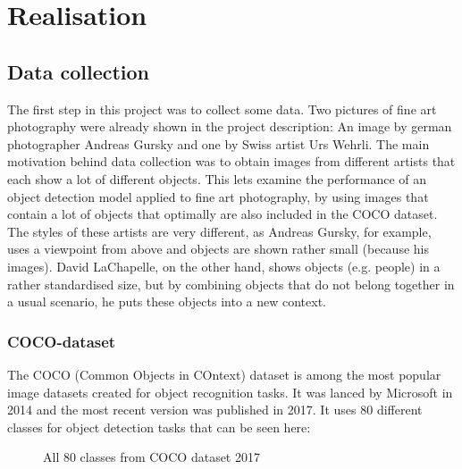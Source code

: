\chapter{Realisation}

\section{Data collection}

The first step in this project was to collect some data. Two pictures of fine art photography were already shown in the project description: An image by german photographer Andreas Gursky and one by Swiss artist Urs Wehrli. The main motivation behind data collection was to obtain images from different artists that each show a lot of different objects. This lets examine the performance of an object detection model applied to fine art photography, by using images that contain a lot of objects that optimally are also included in the COCO dataset. The styles of these artists are very different, as Andreas Gursky, for example, uses a viewpoint from above and objects are shown rather small (because his images). David LaChapelle, on the other hand, shows objects (e.g. people) in a rather standardised size, but by combining objects that do not belong together in a usual scenario, he puts these objects into a new context.

\subsection{COCO-dataset}

The COCO (Common Objects in COntext) dataset is among the most popular image datasets created for object recognition tasks. It was lanced by Microsoft in 2014 and the most recent version was published in 2017. It uses 80 different classes for object detection tasks that can be seen here:

\begin{figure}[!h]
	\caption{\label{fig:input-image} All 80 classes from COCO dataset 2017}
\end{figure}

